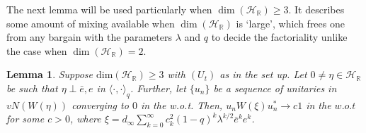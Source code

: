 \documentclass[12pt, a4paper,reqno]{amsart}
\newtheorem{Lemma}[Theorem]{Lemma}
\theoremstyle{definition}
\renewcommand{\geq}{\geqslant}
\def\C{\mathbb C}
\def\R{\mathbb R}
\newcommand{\CH}{\mathcal{H}}
\begin{document}

%
%



%



The next lemma will be used particularly when $\dim(\CH_\R)\geq 3$. It describes some amount of mixing available when $\dim(\CH_\R)$ is `large', which frees one from any bargain with the parameters $\lambda$ and $q$ to decide the  factoriality unlike the case when $\dim(\CH_\R)=2$. 


\begin{Lemma}\label{weakly-1}
Suppose $\text{dim}(\CH_\R) \geq 3$ with $(U_t)$ as in the set up. Let $0\neq \eta \in \CH_\R $ be such that $ \eta \perp \bar{e}, e$ in $\langle\cdot,\cdot\rangle_q$. Further, let $\{ u_n\}$ be a sequence of unitaries in $vN(W(\eta))$ converging to $0$ in the w.o.t. Then, $u_n W(\xi) u_n^* \rightarrow c 1$ in the $w.o.t$ for some $c>0$, where $\xi=d_\infty \sum_{k=0}^\infty c_k^2(1-q)^k \lambda^{k/2} {\bar e}^k e^k$.
\end{Lemma}
\end{document}
